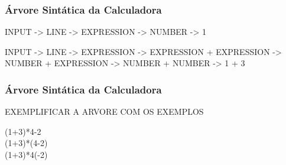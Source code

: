 \documentclass{beamer}
\begin{document}
\begin {frame}
\frametitle{Árvore Sintática da Calculadora }

INPUT ->
  LINE ->
    EXPRESSION ->
      NUMBER ->
	1

INPUT ->
	LINE ->
		EXPRESSION ->
			      EXPRESSION + EXPRESSION ->
							  NUMBER + EXPRESSION ->
										  NUMBER + NUMBER ->
												      1 + 3

\end{frame}

\begin{frame}
\frametitle{Árvore Sintática da Calculadora }

EXEMPLIFICAR A ARVORE COM OS EXEMPLOS 

(1+3)*4-2 \\
(1+3)*(4-2) \\
 (1+3)*4(-2)


\end{frame}
\end{document}
